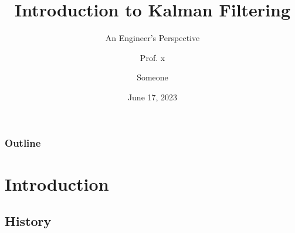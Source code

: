 \documentclass{beamer}
\title{Introduction to Kalman Filtering}
\subtitle{An Engineer's Perspective}
\author{Prof. x \and Someone}
\institute[SCUT] %
{
  School of Automation Science and Engineering\\
  South China University of Technology
	\and
}
\date{June 17, 2023}
\begin{document}
\begin{frame}
\titlepage
\end{frame}

\begin{frame}
\frametitle{Outline}
\tableofcontents
\end{frame}

\section{Introduction}

\subsection{History}


\end{document}
